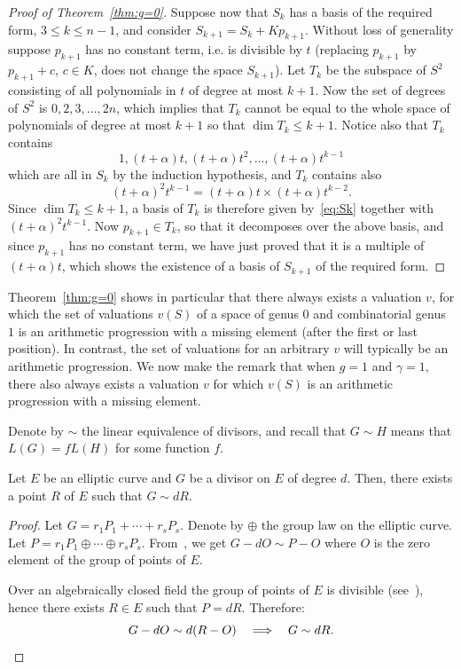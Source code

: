 \documentclass[ALCO,Unicode,ThmDefs]{cedram}
\renewcommand{\leq}{\leqslant}
\newcommand*{\MK}{\mkern 2mu}
\begin{document}
\begin{proof}[Proof of Theorem~\ref{thm:g=0}]
Suppose now that $S_k$ has a basis of the required form, $3\leq k\leq n-1$, and consider $S_{k+1}=S_k+Kp_{k+1}$. Without loss of generality suppose $p_{k+1}$ has no constant term, i.e. is divisible by $t$ (replacing $p_{k+1}$ by $p_{k+1}+c$, $c\in K$, does not change the space $S_{k+1}$). Let $T_k$ be the subspace of $S^2$ consisting of all polynomials in $t$ of degree at most $k+1$. Now the set of degrees of $S^2$ is $0,2,3,\ldots,2n$, which implies that $T_k$ cannot be equal to the whole space of polynomials of degree at most $k+1$ so that $\dim T_k\leq k+1$. Notice also that $T_k$ contains
\begin{equation}\label{eq:Sk}
1,(t+\alpha)t,(t+\alpha)t^2,\ldots,(t+\alpha)t^{k-1}
\end{equation}
which are all in $S_k$ by the induction hypothesis, and $T_k$ contains also
\[
(t+\alpha)^2t^{k-1}=(t+\alpha)t \times (t+\alpha)t^{k-2}.
\]
Since $\dim T_k\leq k+1$, a basis of $T_k$ is therefore given by~\eqref{eq:Sk} together with $(t+\alpha)^2t^{k-1}$. Now $p_{k+1}\in T_k$, so that it decomposes over the above basis, and since $p_{k+1}$ has no constant term, we have just proved that it is a multiple of $(t+\alpha)t$, which shows the existence of a basis of $S_{k+1}$ of the required form.
\end{proof}

Theorem~\ref{thm:g=0} shows in particular that there always exists a valuation $v$, for which the set of valuations $v(S)$ of a space of genus $0$ and combinatorial genus $1$ is an arithmetic progression with a missing element (after the first or last position). In contrast, the set of valuations for an arbitrary $v$ will typically be an arithmetic progression. We now make the remark that when $g=1$ and $\gamma=1$, there also always exists a valuation $v$ for which $v(S)$ is an arithmetic progression with a missing element.

Denote by $\sim$ the linear equivalence of divisors, and recall that $G \sim H$ means that $L(G)= fL(H)$ for some function $f$.

\begin{lemm}\label{lem:one_point}
Let $E$ be an elliptic curve and $G$ be a divisor on $E$ of degree $d$. Then, there exists a point $R$ of $E$ such that $G \sim dR$.
\end{lemm}

\begin{proof}
Let $G= r_1 P_1 + \cdots + r_s P_s$. Denote by $\oplus$ the group law on the elliptic curve. Let $P= r_1P_1 \oplus \cdots \oplus r_s P_s$. From~\cite[Proposition~III.3.4]{Silverman}, we get $ G - dO \sim P-O $ where $O$ is the zero element of the group of points of $E$.

Over an algebraically closed field the group of points of $E$ is divisible (see~\cite[Theorem~4.10$\MK$(a)]{Silverman}), hence there exists $R \in E$ such that $P= dR$. Therefore:
\[
G-dO \sim d(R-O)\quad \Longrightarrow \quad G \sim dR.\qedhere
\]
\end{proof}
\end{document}
